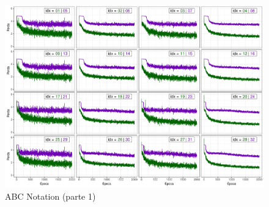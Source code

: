 \documentclass{automatextcc}
\begin{document}
\begin{figure}
    \label{fig:abcnotation_tanh_pt1}
    \centering
    \includegraphics[width=\textwidth]{abcnotation_tanh_loss.pdf}
    \caption{ABC Notation (parte 1)}
\end{figure}
\end{document}
